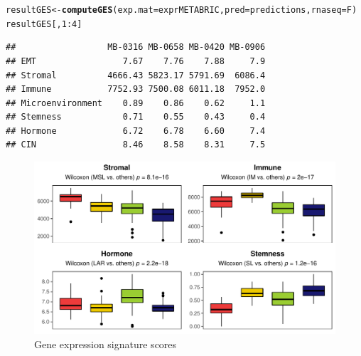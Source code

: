 \documentclass{article}\usepackage[]{graphicx}\usepackage[]{color}
\makeatletter
\def\maxwidth{ %
  \ifdim\Gin@nat@width>\linewidth
    \linewidth
  \else
    \Gin@nat@width
  \fi
}
\newcommand{\hlnum}[1]{\textcolor[rgb]{0.686,0.059,0.569}{#1}}%
\newcommand{\hlopt}[1]{\textcolor[rgb]{0,0,0}{#1}}%
\newcommand{\hlstd}[1]{\textcolor[rgb]{0.345,0.345,0.345}{#1}}%
\newcommand{\hlkwb}[1]{\textcolor[rgb]{0.69,0.353,0.396}{#1}}%
\newcommand{\hlkwc}[1]{\textcolor[rgb]{0.333,0.667,0.333}{#1}}%
\newcommand{\hlkwd}[1]{\textcolor[rgb]{0.737,0.353,0.396}{\textbf{#1}}}%
\newenvironment{kframe}{%
 \def\at@end@of@kframe{}%
 \ifinner\ifhmode%
  \def\at@end@of@kframe{\end{minipage}}%
  \begin{minipage}{\columnwidth}%
 \fi\fi%
 \def\FrameCommand##1{\hskip\@totalleftmargin \hskip-\fboxsep
 \colorbox{shadecolor}{##1}\hskip-\fboxsep
     \hskip-\linewidth \hskip-\@totalleftmargin \hskip\columnwidth}%
 \MakeFramed {\advance\hsize-\width
   \@totalleftmargin\z@ \linewidth\hsize
   \@setminipage}}%
 {\par\unskip\endMakeFramed%
 \at@end@of@kframe}
\newenvironment{knitrout}{}{} %
\makeatother
\begin{document}
\begin{knitrout}
\color{fgcolor}\begin{kframe}
\begin{alltt}
\hlstd{resultGES} \hlkwb{<-} \hlkwd{computeGES}\hlstd{(}\hlkwc{exp.mat} \hlstd{= exprMETABRIC,} \hlkwc{pred} \hlstd{= predictions,} \hlkwc{rnaseq} \hlstd{= F)}
\hlstd{resultGES[,}\hlnum{1}\hlopt{:}\hlnum{4}\hlstd{]}
\end{alltt}
\begin{verbatim}
##                  MB-0316 MB-0658 MB-0420 MB-0906
## EMT                 7.67    7.76    7.88     7.9
## Stromal          4666.43 5823.17 5791.69  6086.4
## Immune           7752.93 7500.08 6011.18  7952.0
## Microenvironment    0.89    0.86    0.62     1.1
## Stemness            0.71    0.55    0.43     0.4
## Hormone             6.72    6.78    6.60     7.4
## CIN                 8.46    8.58    8.31     7.5
\end{verbatim}
\end{kframe}\begin{figure}[H]
\includegraphics[width=\maxwidth]{figure/ges-1} \caption[Gene expression signature scores]{Gene expression signature scores}\label{fig:ges}
\end{figure}


\end{knitrout}
\end{document}
